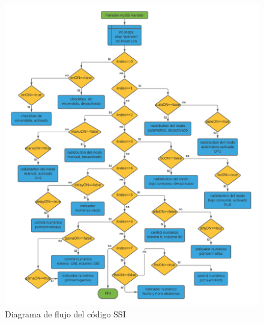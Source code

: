 \begin{figure}[H]
	\centering
	\includegraphics[width=\columnwidth]{imagenes/Diagrama SSI}
	\caption{Diagrama de flujo del código SSI}
	\label{fig:dia_flujSSI}
\end{figure}






\bigskip

\endinput 